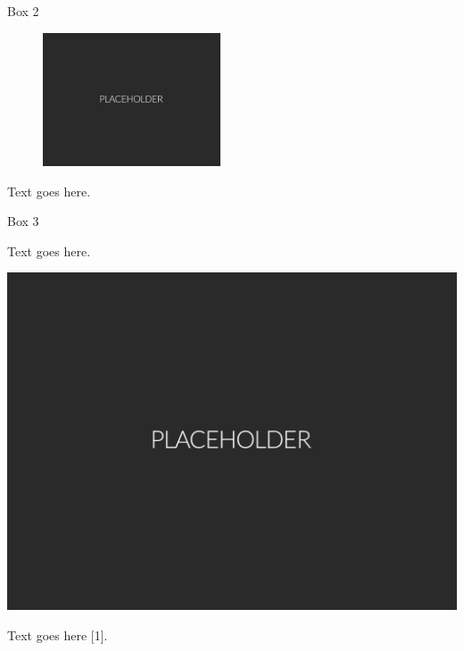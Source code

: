 \documentclass[a0paper,portrait]{baposter}
\begin{document}
\begin{poster}
\begin{posterbox}[name=box2,column=0,below=box1, height=0.315]{Box 2}
\begin{figure}
	\centering
	\vspace{-24pt}
  	\includegraphics[width=0.47\textwidth]{Figures/Placeholder.png}
	\vspace{-2pt}
	\label{fig:figlabel}
\end{figure}

\vspace{10pt}

Text goes here.

\end{posterbox}




\begin{posterbox}[name=box3,column=1,below=box1, height=0.315]{Box 3}

Text goes here.

\begin{center}
  	\includegraphics[height=0.5\textwidth]{Figures/Placeholder.png}
	\vspace{-4pt}
	\label{fig:figlabel}
\end{center}

\vspace{1.7ex}

Text goes here [1].


\end{posterbox}
\end{poster}
\end{document}
